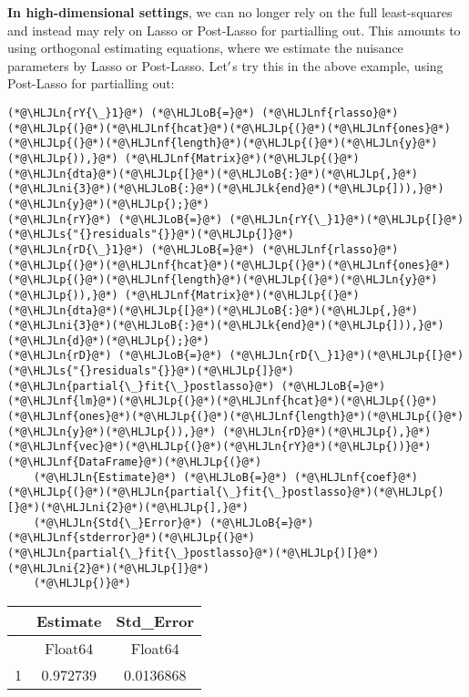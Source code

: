 \documentclass[12pt,a4paper]{article}
\newcommand{\HLJLk}[1]{\textcolor[RGB]{148,91,176}{\textbf{#1}}}
\newcommand{\HLJLn}[1]{#1}
\newcommand{\HLJLnf}[1]{\textcolor[RGB]{66,102,213}{#1}}
\newcommand{\HLJLs}[1]{\textcolor[RGB]{201,61,57}{#1}}
\newcommand{\HLJLni}[1]{\textcolor[RGB]{59,151,46}{#1}}
\newcommand{\HLJLoB}[1]{\textcolor[RGB]{102,102,102}{\textbf{#1}}}
\newcommand{\HLJLp}[1]{#1}
\begin{document}
\textbf{In high-dimensional settings}, we can no longer rely on the full least-squares and instead may rely on Lasso or Post-Lasso for partialling out. This amounts to using orthogonal estimating equations, where we estimate the nuisance parameters by Lasso or Post-Lasso. Let\ensuremath{\rq}s try this in the above example, using Post-Lasso for partialling out:


\begin{lstlisting}
(*@\HLJLn{rY{\_}1}@*) (*@\HLJLoB{=}@*) (*@\HLJLnf{rlasso}@*)(*@\HLJLp{(}@*)(*@\HLJLnf{hcat}@*)(*@\HLJLp{(}@*)(*@\HLJLnf{ones}@*)(*@\HLJLp{(}@*)(*@\HLJLnf{length}@*)(*@\HLJLp{(}@*)(*@\HLJLn{y}@*)(*@\HLJLp{)),}@*) (*@\HLJLnf{Matrix}@*)(*@\HLJLp{(}@*)(*@\HLJLn{dta}@*)(*@\HLJLp{[}@*)(*@\HLJLoB{:}@*)(*@\HLJLp{,}@*)(*@\HLJLni{3}@*)(*@\HLJLoB{:}@*)(*@\HLJLk{end}@*)(*@\HLJLp{])),}@*) (*@\HLJLn{y}@*)(*@\HLJLp{);}@*)
(*@\HLJLn{rY}@*) (*@\HLJLoB{=}@*) (*@\HLJLn{rY{\_}1}@*)(*@\HLJLp{[}@*)(*@\HLJLs{"{}residuals"{}}@*)(*@\HLJLp{]}@*)
(*@\HLJLn{rD{\_}1}@*) (*@\HLJLoB{=}@*) (*@\HLJLnf{rlasso}@*)(*@\HLJLp{(}@*)(*@\HLJLnf{hcat}@*)(*@\HLJLp{(}@*)(*@\HLJLnf{ones}@*)(*@\HLJLp{(}@*)(*@\HLJLnf{length}@*)(*@\HLJLp{(}@*)(*@\HLJLn{y}@*)(*@\HLJLp{)),}@*) (*@\HLJLnf{Matrix}@*)(*@\HLJLp{(}@*)(*@\HLJLn{dta}@*)(*@\HLJLp{[}@*)(*@\HLJLoB{:}@*)(*@\HLJLp{,}@*)(*@\HLJLni{3}@*)(*@\HLJLoB{:}@*)(*@\HLJLk{end}@*)(*@\HLJLp{])),}@*) (*@\HLJLn{d}@*)(*@\HLJLp{);}@*)
(*@\HLJLn{rD}@*) (*@\HLJLoB{=}@*) (*@\HLJLn{rD{\_}1}@*)(*@\HLJLp{[}@*)(*@\HLJLs{"{}residuals"{}}@*)(*@\HLJLp{]}@*)
(*@\HLJLn{partial{\_}fit{\_}postlasso}@*) (*@\HLJLoB{=}@*) (*@\HLJLnf{lm}@*)(*@\HLJLp{(}@*)(*@\HLJLnf{hcat}@*)(*@\HLJLp{(}@*)(*@\HLJLnf{ones}@*)(*@\HLJLp{(}@*)(*@\HLJLnf{length}@*)(*@\HLJLp{(}@*)(*@\HLJLn{y}@*)(*@\HLJLp{)),}@*) (*@\HLJLn{rD}@*)(*@\HLJLp{),}@*) (*@\HLJLnf{vec}@*)(*@\HLJLp{(}@*)(*@\HLJLn{rY}@*)(*@\HLJLp{))}@*)
(*@\HLJLnf{DataFrame}@*)(*@\HLJLp{(}@*)
    (*@\HLJLn{Estimate}@*) (*@\HLJLoB{=}@*) (*@\HLJLnf{coef}@*)(*@\HLJLp{(}@*)(*@\HLJLn{partial{\_}fit{\_}postlasso}@*)(*@\HLJLp{)[}@*)(*@\HLJLni{2}@*)(*@\HLJLp{],}@*) 
    (*@\HLJLn{Std{\_}Error}@*) (*@\HLJLoB{=}@*) (*@\HLJLnf{stderror}@*)(*@\HLJLp{(}@*)(*@\HLJLn{partial{\_}fit{\_}postlasso}@*)(*@\HLJLp{)[}@*)(*@\HLJLni{2}@*)(*@\HLJLp{]}@*)
    (*@\HLJLp{)}@*)
\end{lstlisting}


\begin{tabular}{r|cc}
	& Estimate & Std\_Error\\
	\hline
	& Float64 & Float64\\
	\hline
	1 & 0.972739 & 0.0136868 \\
\end{tabular}
\end{document}
